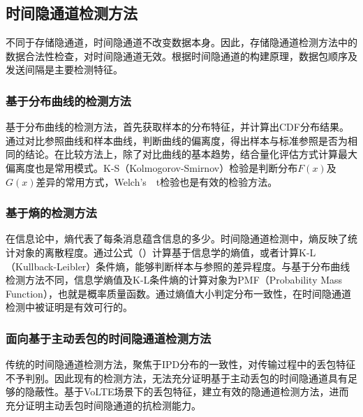 \subsection{时间隐通道检测方法}
\label{sec:intro:background:detect}

不同于存储隐通道，时间隐通道不改变数据本身。因此，存储隐通道检测方法中的数据合法性检查，对时间隐通道无效。根据时间隐通道的构建原理，数据包顺序及发送间隔是主要检测特征。

\subsubsection{基于分布曲线的检测方法}
基于分布曲线的检测方法，首先获取样本的分布特征，并计算出CDF分布结果。通过对比参照曲线和样本曲线，判断曲线的偏离度，得出样本与标准参照是否为相同的结论。在比较方法上，除了对比曲线的基本趋势，结合量化评估方式计算最大偏离度也是常用模式。K-S（Kolmogorov-Smirnov）检验是判断分布$F(x)$及$G(x)$差异的常用方式，{Welch's\ \ t检验}也是有效的检验方法。


\subsubsection{基于熵的检测方法}
在信息论中，熵代表了每条消息蕴含信息的多少。时间隐通道检测中，熵反映了统计对象的离散程度。通过公式（）计算基于信息学的熵值，或者计算K-L（Kullback-Leibler）条件熵，能够判断样本与参照的差异程度。与基于分布曲线检测方法不同，信息学熵值及K-L条件熵的计算对象为PMF（Probability Mass Function），也就是概率质量函数。通过熵值大小判定分布一致性，在时间隐通道检测中被证明是有效可行的。

\subsubsection{面向基于主动丢包的时间隐通道检测方法}
传统的时间隐通道检测方法，聚焦于IPD分布的一致性，对传输过程中的丢包特征不予判别。因此现有的检测方法，无法充分证明基于主动丢包的时间隐通道具有足够的隐蔽性。基于VoLTE场景下的丢包特征，建立有效的隐通道检测方法，进而充分证明主动丢包时间隐通道的抗检测能力。
